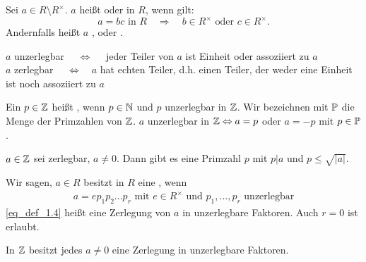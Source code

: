 \setlength{\fboxsep}{10pt}
\setlength{\fboxrule}{3pt}
\begin{center}
\end{center}

\begin{defn} \label{def_1.3}
	Sei $a \in R \setminus R^\times$. $a$ heißt  oder  in $R$, wenn gilt:
	\[ a = bc \text{ in } R \quad \Rightarrow \quad b \in R^\times \text{ oder } c \in R^\times. \]
	Andernfalls heißt $a$ ,  oder .
\end{defn}

	$a$ unzerlegbar $\quad \Leftrightarrow \quad $ jeder Teiler von $a$ ist Einheit oder assoziiert zu $a$ \\
	$a$ zerlegbar $\quad \Leftrightarrow \quad a$ hat echten Teiler, d.h. einen Teiler, der weder eine Einheit ist noch assoziiert zu $a$

\setcounter{countdef}{2}
\begin{defn}[Primzahl] \label{def_1.3'}
	Ein $p \in \mathbb{Z}$ heißt , wenn $p \in \mathbb{N}$ und $p$ unzerlegbar in $\mathbb{Z}$. Wir bezeichnen mit $\mathbb{P}$ die Menge der Primzahlen von $\mathbb{Z}$. $a$ unzerlegbar in $\mathbb{Z} \Leftrightarrow a = p$ oder $a = -p$ mit $p \in \mathbb{P}$.
\end{defn}

	$a \in \mathbb{Z}$ sei zerlegbar, $a \neq 0$. Dann gibt es eine Primzahl $p$ mit $p | a$ und $p \leq \sqrt{|a|}$.

\begin{defn} \label{def_1.4}
	Wir sagen, $a \in R$ besitzt in $R$ eine , wenn
	\begin{equation}
	\begin{aligned}
		a = ep_1p_2\dots p_r \text{ mit } e \in R^\times \text{ und } p_1,\dots,p_r \text{ unzerlegbar} \label{eq_def_1.4}
	\end{aligned}
	\end{equation}
	\eqref{eq_def_1.4} heißt eine Zerlegung von $a$ in unzerlegbare Faktoren. Auch $r = 0$ ist erlaubt.
\end{defn}

\begin{falko} \label{F1.3}
	In $\mathbb{Z}$ besitzt jedes $a \neq 0$ eine Zerlegung in unzerlegbare Faktoren.
\end{falko}	

